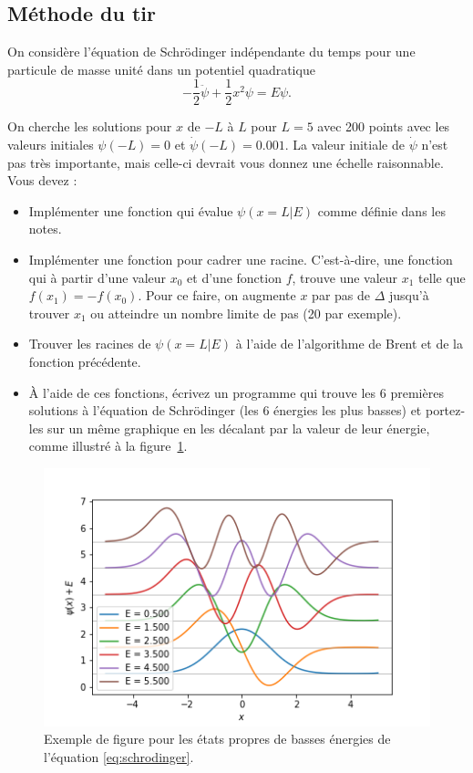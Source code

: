 \documentclass[12pt, letterpaper]{article}
\numberwithin{table}{section}
\numberwithin{figure}{section}
\numberwithin{equation}{section}
\begin{document}
\subsection{Méthode du tir}\label{subsec:methode-du-tir}

\noindent On considère l’équation de Schrödinger indépendante du temps pour une particule de masse unité dans
un potentiel quadratique
\begin{equation}
    \label{eq:schrodinger}
    - \frac{1}{2} \ddot{\psi} + \frac{1}{2} x^2 \psi = E \psi.
\end{equation}

\noindent On cherche les solutions pour $x$ de $-L$ à $L$ pour $L = 5$ avec 200 points
avec les valeurs initiales $\psi(-L) = 0$ et $\dot \psi(-L) = 0.001$.
La valeur initiale de $\dot \psi$ n'est pas très importante,
mais celle-ci devrait vous donnez une échelle raisonnable.
Vous devez :
\begin{itemize}
    \item
    Implémenter une fonction qui évalue $\psi(x = L|E)$ comme définie dans les notes.

    \item
    Implémenter une fonction pour cadrer une racine.
    C’est-à-dire, une fonction qui à partir d’une valeur $x_0$ et d’une fonction $f$,
    trouve une valeur $x_1$ telle que $f(x_1) = -f(x_0)$.
    Pour ce faire, on augmente $x$ par pas de $\Delta$ jusqu’à trouver
    $x_1$ ou atteindre un nombre limite de pas (20 par exemple).

    \item
    Trouver les racines de $\psi(x = L|E)$ à l’aide de l’algorithme de Brent et de la fonction précédente.

    \item
    À l’aide de ces fonctions, écrivez un programme qui trouve les 6 premières solutions à l’équation de
    Schrödinger (les 6 énergies les plus basses) et portez-les sur un même graphique en les décalant par la
    valeur de leur énergie, comme illustré à la figure~\ref{fig:exemple}.
\end{itemize}

\begin{figure}[h!!]
    \centering
    \includegraphics[scale=0.5]{../images/exemple}
    \caption{Exemple de figure pour les états propres de basses énergies
    de l'équation \ref{eq:schrodinger}.}
    \label{fig:exemple}
\end{figure}
\end{document}
